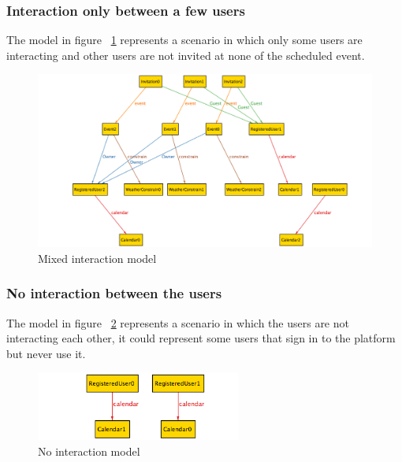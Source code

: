 \subsubsection{Interaction only between a few users}
The model in figure ~\ref{fig:mixint} represents a scenario in which only some users are interacting and other users are not invited at none of the scheduled event.
\begin{center}
 \begin{figure}[H]
    \includegraphics[width=1.1\textwidth,height=0.7\textwidth]{./Alloy/mixInt.png}
    \caption{Mixed interaction model}
     \label{fig:mixint}
     \end{figure}
   \end{center} 
\subsubsection{No interaction between the users}
The model in figure ~\ref{fig:noint} represents a scenario in which the users are not interacting each other, it could represent some users that sign in to the platform but never use it.
\begin{center}
 \begin{figure}[H]
    \includegraphics[width=0.6\textwidth]{./Alloy/noInteration.png}
    \caption{No interaction model}
     \label{fig:noint}
     \end{figure}
   \end{center} 